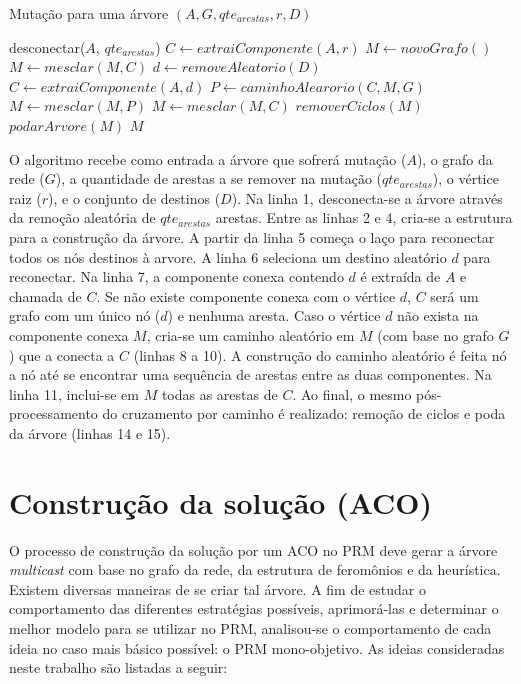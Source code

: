 \begin{algorithm}
	\caption{Mutação para uma árvore $(A, G, qte_{arestas}, r, D)$}
	\label{alg_prm_mutacao}
	\begin{algorithmic}[1]
		\State desconectar($A$, $qte_{arestas}$)
		\State $C \gets extraiComponente(A, r)$
		\State $M \gets novoGrafo()$
		\State $M \gets mesclar(M, C)$
		\State $d \gets removeAleatorio(D)$
		\State $C \gets extraiComponente(A, d)$
		\State $P \gets caminhoAlearorio(C, M, G)$
		\State $M \gets mesclar(M, P)$
		\EndIf
		\State $M \gets mesclar(M, C)$
		\EndWhile
		\State $removerCiclos(M)$
		\State $podarArvore(M)$
		\State \Return $M$
	\end{algorithmic}
\end{algorithm}

O algoritmo recebe como entrada a árvore que sofrerá mutação ($A$), o grafo da rede ($G$), a quantidade de arestas a se remover na mutação ($qte_{arestas}$), o vértice raiz ($r$), e o conjunto de destinos ($D$). Na linha 1, desconecta-se a árvore através da remoção aleatória de $qte_{arestas}$ arestas. Entre as linhas 2 e 4, cria-se a estrutura para a construção da árvore. A partir da linha 5 começa o laço para reconectar todos os nós destinos à arvore. A linha 6 seleciona um destino aleatório $d$ para reconectar. Na linha 7, a componente conexa contendo $d$ é extraída de $A$ e chamada de $C$. Se não existe componente conexa com o vértice $d$, $C$ será um grafo com um único nó ($d$) e nenhuma aresta. Caso o vértice $d$ não exista na componente conexa $M$, cria-se um caminho aleatório em $M$ (com base no grafo $G$) que a conecta a $C$ (linhas 8 a 10). A construção do caminho aleatório é feita nó a nó até se encontrar uma sequência de arestas entre as duas componentes. Na linha 11, inclui-se em $M$ todas as arestas de $C$. Ao final, o mesmo pós-processamento do cruzamento por caminho é realizado: remoção de ciclos e poda da árvore (linhas 14 e 15).

\section{Construção da solução (ACO)}
\label{section_estrategias_prm_aco}

O processo de construção da solução por um ACO no PRM deve gerar a árvore \textit{multicast} com base no grafo da rede, da estrutura de feromônios e da heurística. Existem diversas maneiras de se criar tal árvore. A fim de estudar o comportamento das diferentes estratégias possíveis, aprimorá-las e determinar o melhor modelo para se utilizar no PRM, analisou-se o comportamento de cada ideia no caso mais básico possível: o PRM mono-objetivo. As ideias consideradas neste trabalho são listadas a seguir:

